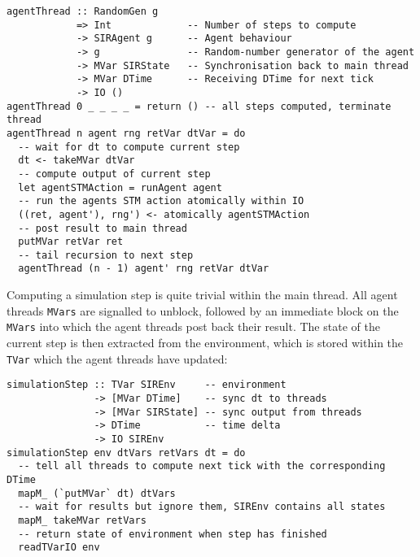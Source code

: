 \begin{footnotesize}
\begin{verbatim}
agentThread :: RandomGen g 
            => Int             -- Number of steps to compute
            -> SIRAgent g      -- Agent behaviour 
            -> g               -- Random-number generator of the agent
            -> MVar SIRState   -- Synchronisation back to main thread
            -> MVar DTime      -- Receiving DTime for next tick
            -> IO ()
agentThread 0 _ _ _ _ = return () -- all steps computed, terminate thread
agentThread n agent rng retVar dtVar = do
  -- wait for dt to compute current step
  dt <- takeMVar dtVar
  -- compute output of current step
  let agentSTMAction = runAgent agent
  -- run the agents STM action atomically within IO
  ((ret, agent'), rng') <- atomically agentSTMAction 
  -- post result to main thread
  putMVar retVar ret
  -- tail recursion to next step 
  agentThread (n - 1) agent' rng retVar dtVar
\end{verbatim}
\end{footnotesize}

\medskip %

Computing a simulation step is quite trivial within the main thread. All agent threads \texttt{MVars} are signalled to unblock, followed by an immediate block on the \texttt{MVars} into which the agent threads post back their result. The state of the current step is then extracted from the environment, which is stored within the \texttt{TVar} which the agent threads have updated: \\ %

\begin{footnotesize}
\begin{verbatim}
simulationStep :: TVar SIREnv     -- environment 
               -> [MVar DTime]    -- sync dt to threads
               -> [MVar SIRState] -- sync output from threads
               -> DTime           -- time delta
               -> IO SIREnv
simulationStep env dtVars retVars dt = do
  -- tell all threads to compute next tick with the corresponding DTime
  mapM_ (`putMVar` dt) dtVars
  -- wait for results but ignore them, SIREnv contains all states
  mapM_ takeMVar retVars
  -- return state of environment when step has finished
  readTVarIO env
\end{verbatim}
\end{footnotesize}
